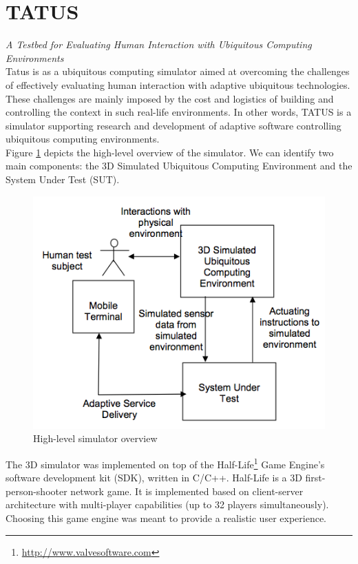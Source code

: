 \section{TATUS}\label{sec:tatus}
\emph{A Testbed for Evaluating Human Interaction with Ubiquitous Computing Environments}\\

Tatus \cite{o2005testbed} is as a ubiquitous computing simulator aimed at overcoming the challenges of effectively evaluating human interaction with adaptive ubiquitous technologies. These challenges are mainly imposed by the cost and logistics of building and controlling the context in such real-life environments. In other words, TATUS is a simulator supporting research and development of adaptive software controlling ubiquitous computing environments.\\

Figure \ref{fig:tatus_overview} depicts the high-level overview of the simulator. We can identify two main components: the 3D Simulated Ubiquitous Computing Environment and the System Under Test (SUT).\\

\begin{figure}[H]
	\centering
	\includegraphics[width=\linewidth]{gfx/Chapter2/tatus_system_overview}
	\caption{High-level simulator overview}
	\label{fig:tatus_overview}
\end{figure}

The 3D simulator was implemented on top of the Half-Life\footnote{\url{http://www.valvesoftware.com}} Game Engine's software development kit (SDK), written in C/C++. Half-Life is a 3D first-person-shooter network game. It is implemented based on client-server architecture with multi-player capabilities (up to 32 players simultaneously). Choosing this game engine was meant to provide a realistic user experience.\\

